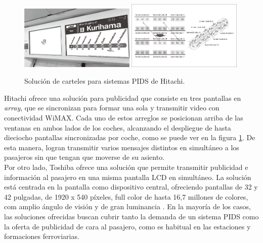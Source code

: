 \begin{figure}[h!]
	\centering
	\includegraphics[width=0.49\textwidth]{./Figures/HitachiCartelPIDS.png}
	\includegraphics[width=0.49\textwidth]{./Figures/HitachiDisplayArray.png}
	\caption{Solución de carteles para sistemas PIDS de Hitachi.\protect\footnotemark}
	\label{fig:Hitachi}
\end{figure}


Hitachi ofrece una solución para publicidad que consiste en tres pantallas en \textit{array}, que se sincronizan para formar una sola y transmitir video con conectividad WiMAX. Cada uno de estos arreglos se posicionan arriba de las ventanas en ambos lados de los coches, alcanzando el despliegue de hasta dieciocho pantallas sincronizadas por coche, como se puede ver en la figura \ref{fig:Hitachi}. De esta manera, logran transmitir varios mensajes distintos en simultáneo a los pasajeros sin que tengan que moverse de su asiento.\\


Por otro lado, Toshiba ofrece una solución que permite transmitir publicidad e información al pasajero en una misma pantalla LCD en simultáneo. La solución está centrada en la pantalla como dispositivo central, ofreciendo pantallas de 32 y 42 pulgadas, de 1920 x 540 píxeles, full color de hasta 16,7 millones de colores, com amplio ángulo de visión y de gran luminancia \citep{Toshiba}. En la mayoría de los casos, las soluciones ofrecidas buscan cubrir tanto la demanda de un sistema PIDS como la oferta de publicidad de cara al pasajero, como es habitual en las estaciones y formaciones ferroviarias.\\



